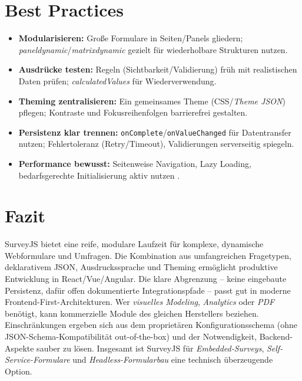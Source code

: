 \documentclass[11pt,a4paper]{article}
\begin{document}
\section{Best Practices}
\begin{itemize}
  \item \textbf{Modularisieren:} Große Formulare in Seiten/Panels gliedern; \emph{paneldynamic}/\emph{matrixdynamic} gezielt für wiederholbare Strukturen nutzen.
  \item \textbf{Ausdrücke testen:} Regeln (Sichtbarkeit/Validierung) früh mit realistischen Daten prüfen; \emph{calculatedValues} für Wiederverwendung.
  \item \textbf{Theming zentralisieren:} Ein gemeinsames Theme (CSS/\emph{Theme JSON}) pflegen; Kontraste und Fokusreihenfolgen barrierefrei gestalten.
  \item \textbf{Persistenz klar trennen:} \verb|onComplete|/\verb|onValueChanged| für Datentransfer nutzen; Fehlertoleranz (Retry/Timeout), Validierungen serverseitig spiegeln.
  \item \textbf{Performance bewusst:} Seitenweise Navigation, Lazy Loading, bedarfsgerechte Initialisierung aktiv nutzen \cite{surveyjs-lazy-loading}.
\end{itemize}

\section{Fazit}
SurveyJS bietet eine reife, modulare Laufzeit für komplexe, dynamische Webformulare und Umfragen. Die Kombination aus umfangreichen Fragetypen, deklarativem JSON, Ausdruckssprache und Theming ermöglicht produktive Entwicklung in React/Vue/Angular. Die klare Abgrenzung -- keine eingebaute Persistenz, dafür offen dokumentierte Integrationspfade -- passt gut in moderne Frontend-First-Architekturen. Wer \emph{visuelles Modeling}, \emph{Analytics} oder \emph{PDF} benötigt, kann kommerzielle Module des gleichen Herstellers beziehen. Einschränkungen ergeben sich aus dem proprietären Konfigurationsschema (ohne JSON-Schema-Kompatibilität out-of-the-box) und der Notwendigkeit, Backend-Aspekte sauber zu lösen. Insgesamt ist SurveyJS für \emph{Embedded-Surveys}, \emph{Self-Service-Formulare} und \emph{Headless-Formularbau} eine technisch überzeugende Option.
\end{document}
